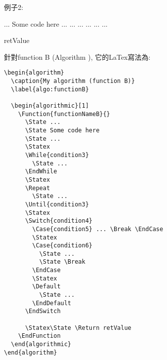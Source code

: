 
\newpage
例子2:
\begin{algorithm}
  \caption{My algorithm (function B)}
  \label{algo:functionB}

  \begin{algorithmic}[1]
      \State ...
      \State Some code here
      \State ...
      \Statex
        \State ...
      \EndWhile
      \Statex
      \Repeat
        \State ...
      \Statex
         ... \Break \EndCase
        \Statex
          \State ...
          \State \Break
        \EndCase
        \Statex
        \Default
          \State ...
        \EndDefault
      \EndSwitch

      \Statex\State \Return retValue
    \EndFunction
  \end{algorithmic}
\end{algorithm}

\newpage
針對function B (Algorithm ), 它的LaTex寫法為:
    \EmptyLine
\begin{DescriptionFrame}
  \begin{verbatim}
\begin{algorithm}
  \caption{My algorithm (function B)}
  \label{algo:functionB}

  \begin{algorithmic}[1]
    \Function{functionNameB}{}
      \State ...
      \State Some code here
      \State ...
      \Statex
      \While{condition3}
        \State ...
      \EndWhile
      \Statex
      \Repeat
        \State ...
      \Until{condition3}
      \Statex
      \Switch{condition4}
        \Case{condition5} ... \Break \EndCase
        \Statex
        \Case{condition6}
          \State ...
          \State \Break
        \EndCase
        \Statex
        \Default
          \State ...
        \EndDefault
      \EndSwitch

      \Statex\State \Return retValue
    \EndFunction
  \end{algorithmic}
\end{algorithm}
  \end{verbatim}
\end{DescriptionFrame}

